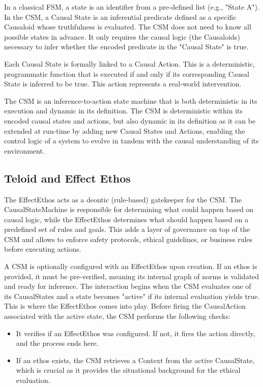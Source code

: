 In a classical FSM, a state is an identifier from a pre-defined list (e.g., "State A").
In the CSM, a Causal State is an inferential predicate defined as a specific Causaloid whose truthfulness is evaluated. The CSM does not need to know all possible states in advance. It only requires the causal logic (the Causaloids) necessary to infer whether the encoded predicate in the "Causal State" is true. 

Each Causal State is formally linked to a Causal Action. This is a deterministic, programmatic function that is executed if and only if its corresponding Causal State is inferred to be true. This action represents a real-world intervention.

The CSM is an inference-to-action state machine that is both deterministic in its execution and dynamic in its definition. The CSM is deterministic within its encoded causal states and actions, but also dynamic in its definition as it can be extended at run-time by adding new Causal States and Actions, enabling the control logic of a system to evolve in tandem with the causal understanding of its environment. 

%
%
\subsection{Teloid and Effect Ethos}
\label{sec:epp_effect_ethos}

The EffectEthos acts as a deontic (rule-based) gatekeeper for the CSM. The CausalStateMachine is responsible for determining what could happen based on causal logic, while the EffectEthos determines what should happen based on a predefined set of rules and goals. This adds a layer of governance on top of the CSM and allows to enforce safety protocols, ethical guidelines, or business rules before executing actions.
 
A CSM is optionally configured with an EffectEthos upon creation. If an ethos is provided, it must be pre-verified, meaning its internal graph of norms is validated and ready for inference. The interaction begins when the CSM evaluates one of its CausalStates and a state becomes "active" if its internal evaluation yields true. This is where the EffectEthos comes into play. Before firing the CausalAction associated with the active state, the CSM performs the following checks:

\begin{itemize}
	\item It verifies if an EffectEthos was configured. If not, it fires the action directly, and the process ends here.
	\item If an ethos exists, the CSM retrieves a Context from the active CausalState, which is crucial as it provides the situational background for the ethical evaluation.
\end{itemize}

